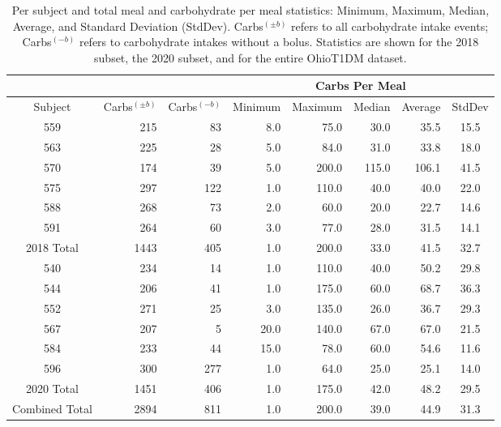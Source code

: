 \begin{table}[t]\setlength{\tabcolsep}{4pt}
\begin{center}
\caption{Per subject and total meal and carbohydrate per meal statistics: Minimum, Maximum, Median, Average, and Standard Deviation (StdDev). Carbs$^{(\pm b)}$ refers to all carbohydrate intake events; Carbs$^{(-b)}$ refers to carbohydrate intakes without a bolus. Statistics are shown for the 2018 subset, the 2020 subset, and for the entire OhioT1DM dataset.}
\label{tab:meals}
\small
\begin{tabular}{|crr|rrrrc|}
    \cline{4-8}
    \multicolumn{3}{c}{} & \multicolumn{5}{|c|}{Carbs Per Meal}\\
	\hline
	Subject & \multicolumn{1}{c}{Carbs$^{(\pm b)}$} & \multicolumn{1}{c|}{Carbs$^{(-b)}$} & \multicolumn{1}{c}{Minimum} & \multicolumn{1}{c}{Maximum}
	& \multicolumn{1}{c}{Median} & \multicolumn{1}{c}{Average} & StdDev\\
	\hline
	559 & 215 & 83 & 8.0 & 75.0 & 30.0 & 35.5 & 15.5\\
    563 & 225 & 28 & 5.0 & 84.0 & 31.0 & 33.8 & 18.0\\
    570 & 174 & 39 & 5.0 & 200.0 & 115.0 & 106.1 & 41.5\\
	575 & 297 & 122 & 1.0 & 110.0 & 40.0 & 40.0 & 22.0\\
	588 & 268 & 73 & 2.0 & 60.0 & 20.0 & 22.7 & 14.6\\
	591 & 264 & 60 & 3.0 & 77.0 & 28.0 & 31.5 & 14.1\\
	\hline
	2018 Total & 1443 & 405 & 1.0 & 200.0 & 33.0 & 41.5 & 32.7\\
	\hline
	540 & 234 & 14 & 1.0 & 110.0 & 40.0 & 50.2 & 29.8\\
	544 & 206 & 41 & 1.0 & 175.0 & 60.0 & 68.7 & 36.3\\
	552 & 271 & 25 & 3.0 & 135.0 & 26.0 & 36.7 & 29.3\\
	567 & 207 & 5 & 20.0 & 140.0 & 67.0 & 67.0 & 21.5\\
	584 & 233 & 44 & 15.0 & 78.0 & 60.0 & 54.6 & 11.6\\
	596 & 300 & 277 & 1.0 & 64.0 & 25.0 & 25.1 & 14.0\\
	\hline
	2020 Total & 1451 & 406 & 1.0 & 175.0 & 42.0 & 48.2 & 29.5\\
	\hline
	Combined Total & 2894 & 811 & 1.0 & 200.0 & 39.0 & 44.9 & 31.3\\
	\hline
\end{tabular}
\end{center}
\end{table}

